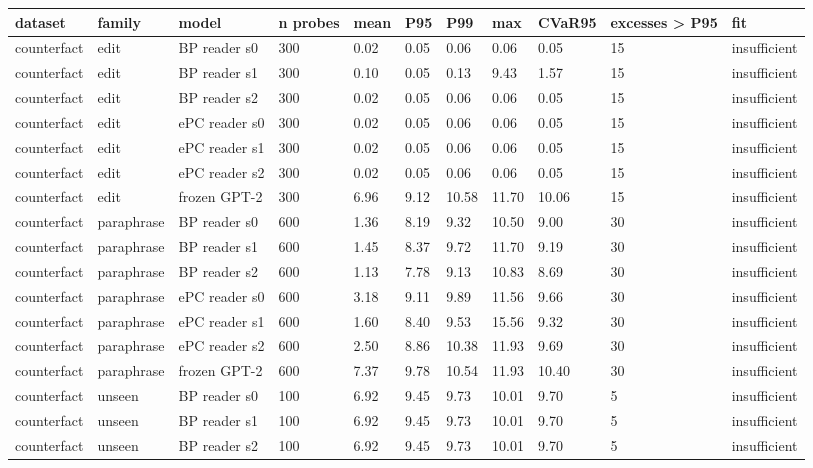 \documentclass[10pt,a4paper]{article}
\begin{document}
\begin{center}\tiny
\begin{tabularx}{\textwidth}{@{}p{}XXXXXXXXXX@{}}
\toprule
dataset & family & model & n probes & mean & P95 & P99 & max & CVaR95 & excesses > P95 & fit \\ \midrule
counterfact & edit & BP reader s0 & 300 & 0.02 & 0.05 & 0.06 & 0.06 & 0.05 & 15 & insufficient \\
counterfact & edit & BP reader s1 & 300 & 0.10 & 0.05 & 0.13 & 9.43 & 1.57 & 15 & insufficient \\
counterfact & edit & BP reader s2 & 300 & 0.02 & 0.05 & 0.06 & 0.06 & 0.05 & 15 & insufficient \\
counterfact & edit & ePC reader s0 & 300 & 0.02 & 0.05 & 0.06 & 0.06 & 0.05 & 15 & insufficient \\
counterfact & edit & ePC reader s1 & 300 & 0.02 & 0.05 & 0.06 & 0.06 & 0.05 & 15 & insufficient \\
counterfact & edit & ePC reader s2 & 300 & 0.02 & 0.05 & 0.06 & 0.06 & 0.05 & 15 & insufficient \\
counterfact & edit & frozen GPT-2 & 300 & 6.96 & 9.12 & 10.58 & 11.70 & 10.06 & 15 & insufficient \\
counterfact & paraphrase & BP reader s0 & 600 & 1.36 & 8.19 & 9.32 & 10.50 & 9.00 & 30 & insufficient \\
counterfact & paraphrase & BP reader s1 & 600 & 1.45 & 8.37 & 9.72 & 11.70 & 9.19 & 30 & insufficient \\
counterfact & paraphrase & BP reader s2 & 600 & 1.13 & 7.78 & 9.13 & 10.83 & 8.69 & 30 & insufficient \\
counterfact & paraphrase & ePC reader s0 & 600 & 3.18 & 9.11 & 9.89 & 11.56 & 9.66 & 30 & insufficient \\
counterfact & paraphrase & ePC reader s1 & 600 & 1.60 & 8.40 & 9.53 & 15.56 & 9.32 & 30 & insufficient \\
counterfact & paraphrase & ePC reader s2 & 600 & 2.50 & 8.86 & 10.38 & 11.93 & 9.69 & 30 & insufficient \\
counterfact & paraphrase & frozen GPT-2 & 600 & 7.37 & 9.78 & 10.54 & 11.93 & 10.40 & 30 & insufficient \\
counterfact & unseen & BP reader s0 & 100 & 6.92 & 9.45 & 9.73 & 10.01 & 9.70 & 5 & insufficient \\
counterfact & unseen & BP reader s1 & 100 & 6.92 & 9.45 & 9.73 & 10.01 & 9.70 & 5 & insufficient \\
counterfact & unseen & BP reader s2 & 100 & 6.92 & 9.45 & 9.73 & 10.01 & 9.70 & 5 & insufficient \\

\end{tabularx}
\end{center}
\end{document}
